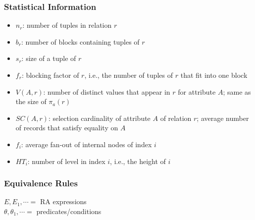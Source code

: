 \subsubsection{Statistical Information}
\begin{itemize}[label=\(\rhd\)]
    \item $n_r$: number of tuples in relation $r$
    \item $b_r$: number of blocks containing tuples of $r$
    \item $s_r$: size of a tuple of $r$
    \item $f_r$: blocking factor of $r$, i.e., the number of tuples of $r$ that fit into one block
    \item $V(A,r)$: number of distinct values that appear in $r$ for attribute $A$; same as the size of $\pi_a(r)$
    \item $SC(A,r)$: selection cardinality of attribute $A$ of relation $r$; average number of records that satisfy equality on $A$
    \item $f_i$: average fan-out of internal nodes of index $i$
    \item $HT_i$: number of level in index $i$, i.e., the height of $i$
\end{itemize}

\subsubsection{Equivalence Rules}
$E,E_1,\cdots = $ RA expressions\\
$\theta,\theta_1,\cdots =$ predicates/conditions

